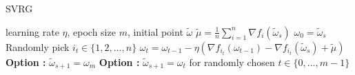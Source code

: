 \documentclass[conference]{IEEEtran}
\begin{document}
 \begin{algorithm}[t]
 	\caption{\textsc{SVRG}}
	\label{SVRG}
	\begin{algorithmic}[1]
	\Require learning rate $\eta$,  epoch size $m$, initial point $\tilde{\omega}$
		\State $\tilde{\mu} = \frac{1}{n}\sum\limits_{i=1}^{n}\nabla f_{i}(\tilde{\omega}_{s})$
		\State $\omega_0 = \tilde{\omega}_s$
			\State Randomly pick $i_t\in\{1, 2, ..., n\}$
			\State $\omega_t = \omega_{t-1} - \eta(\nabla f_{i_t}(\omega_{t-1}) - \nabla f_{i_t}(\tilde{\omega}_s)+\tilde{\mu})$
		\EndFor
		\State \textbf{Option \uppercase\expandafter{}:} $\tilde{\omega}_{s+1} = \omega_{m}$
		\State \textbf{Option \uppercase\expandafter{}:} $\tilde{\omega}_{s+1} = \omega_{t}$ for randomly chosen $t \in \{0, ... ,m - 1\}$ 
	\EndFor
	\end{algorithmic}
\end{algorithm}
\end{document}
